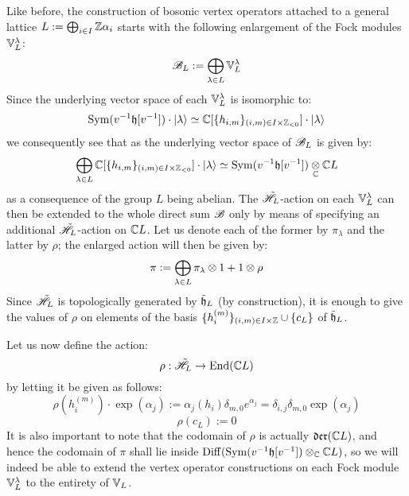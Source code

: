        Like before, the construction of bosonic vertex operators attached to a general lattice $L := \bigoplus_{i \in I} \mathbb{Z} \alpha_i$ starts with the following enlargement of the Fock modules $\mathbb{V}_L^{\lambda}$:
            $$\mathscr{B}_L := \bigoplus_{\lambda \in L} \mathbb{V}_L^{\lambda}$$
        Since the underlying vector space of each $\mathbb{V}_L^{\lambda}$ is isomorphic to:
            $$\Sym( v^{-1}\h[v^{-1}] ) \cdot \ket{\lambda} \cong \bbC[ \{h_{i, m}\}_{(i, m) \in I \x \Z_{< 0}} ] \cdot \ket{\lambda}$$
        we consequently see that as the underlying vector space of $\mathscr{B}_L$ is given by:
            $$\bigoplus_{\lambda \in L} \bbC[ \{h_{i, m}\}_{(i, m) \in I \x \Z_{< 0}} ] \cdot \ket{\lambda} \cong \Sym( v^{-1}\h[v^{-1}] ) \tensor_{\bbC} \bbC L$$
        as a consequence of the group $L$ being abelian. The $\tilde{\mathscr{H}}_L$-action on each $\mathbb{V}_L^{\lambda}$ can then be extended to the whole direct sum $\mathscr{B}$ only by means of specifying an additional $\tilde{\mathscr{H}}_L$-action on $\mathbb{C} L$. Let us denote each of the former by $\pi_{\lambda}$ and the latter by $\rho$; the enlarged action will then be given by:
            $$\pi := \bigoplus_{\lambda \in L} \pi_{\lambda} \tensor 1 + 1 \tensor \rho$$
        Since $\tilde{\mathscr{H}}_L$ is topologically generated by $\tilde{\mathfrak{h}}_L$ (by construction), it is enough to give the values of $\rho$ on elements of the basis $\{h_i^{(m)}\}_{(i, m) \in I \x \Z} \cup \{c_L\}$ of $\tilde{\mathfrak{h}}_L$.

        Let us now define the action:
            $$\rho: \tilde{\mathscr{H}}_L \to \mathrm{End}( \mathbb{C} L )$$
        by letting it be given as follows:
            $$\rho( h_i^{(m)} ) \cdot \exp(\alpha_j) := \alpha_j(h_i) \delta_{m, 0} e^{\alpha_j} = \delta_{i, j} \delta_{m, 0} \exp(\alpha_j)$$
            $$\rho(c_L) := 0$$
        It is also important to note that the codomain of $\rho$ is actually $\mathfrak{der}(\mathbb{C} L)$, and hence the codomain of $\pi$ shall lie inside $\Diff( \Sym( v^{-1}\h[v^{-1}] ) \tensor_{\bbC} \bbC L )$, so we will indeed be able to extend the vertex operator constructions on each Fock module $\mathbb{V}_L^{\lambda}$ to the entirety of $\mathbb{V}_L$.

